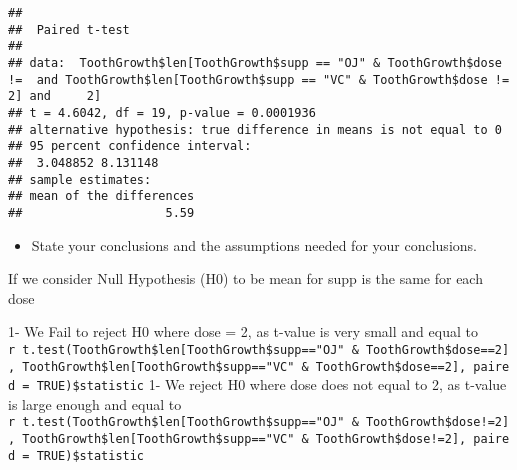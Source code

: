 \documentclass[]{article}
\newenvironment{Shaded}{\begin{snugshade}}{\end{snugshade}}
\newcommand{\CommentTok}[1]{\textcolor[rgb]{0.56,0.35,0.01}{\textit{#1}}}
\newcommand{\DataTypeTok}[1]{\textcolor[rgb]{0.13,0.29,0.53}{#1}}
\newcommand{\DecValTok}[1]{\textcolor[rgb]{0.00,0.00,0.81}{#1}}
\newcommand{\KeywordTok}[1]{\textcolor[rgb]{0.13,0.29,0.53}{\textbf{#1}}}
\newcommand{\NormalTok}[1]{#1}
\newcommand{\OperatorTok}[1]{\textcolor[rgb]{0.81,0.36,0.00}{\textbf{#1}}}
\newcommand{\OtherTok}[1]{\textcolor[rgb]{0.56,0.35,0.01}{#1}}
\newcommand{\StringTok}[1]{\textcolor[rgb]{0.31,0.60,0.02}{#1}}
\providecommand{\tightlist}{%
  \setlength{\itemsep}{0pt}\setlength{\parskip}{0pt}}
\begin{document}
\begin{Shaded}
\end{Shaded}

\begin{verbatim}
## 
##  Paired t-test
## 
## data:  ToothGrowth$len[ToothGrowth$supp == "OJ" & ToothGrowth$dose !=  and ToothGrowth$len[ToothGrowth$supp == "VC" & ToothGrowth$dose !=     2] and     2]
## t = 4.6042, df = 19, p-value = 0.0001936
## alternative hypothesis: true difference in means is not equal to 0
## 95 percent confidence interval:
##  3.048852 8.131148
## sample estimates:
## mean of the differences 
##                    5.59
\end{verbatim}

\begin{itemize}
\tightlist
\item
  State your conclusions and the assumptions needed for your
  conclusions.
\end{itemize}

If we consider Null Hypothesis (H0) to be mean for supp is the same for
each dose

1- We Fail to reject H0 where dose = 2, as t-value is very small and
equal to
\texttt{r\ t.test(ToothGrowth\$len{[}ToothGrowth\$supp=="OJ"\ \&\ ToothGrowth\$dose==2{]},\ ToothGrowth\$len{[}ToothGrowth\$supp=="VC"\ \&\ ToothGrowth\$dose==2{]},\ paired\ =\ TRUE)\$statistic}
1- We reject H0 where dose does not equal to 2, as t-value is large
enough and equal to
\texttt{r\ t.test(ToothGrowth\$len{[}ToothGrowth\$supp=="OJ"\ \&\ ToothGrowth\$dose!=2{]},\ ToothGrowth\$len{[}ToothGrowth\$supp=="VC"\ \&\ ToothGrowth\$dose!=2{]},\ paired\ =\ TRUE)\$statistic}
\end{document}
